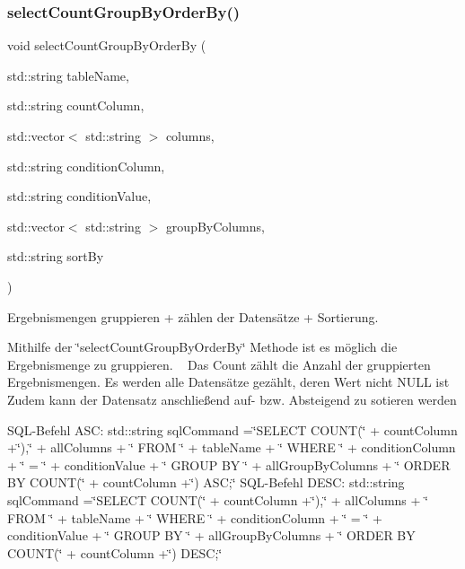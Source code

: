 \subsubsection{select\+Count\+Group\+By\+Order\+By()}
{\footnotesize\ttfamily void select\+Count\+Group\+By\+Order\+By (\begin{DoxyParamCaption}\item[{std\+::string}]{table\+Name,  }\item[{std\+::string}]{count\+Column,  }\item[{std\+::vector$<$ std\+::string $>$}]{columns,  }\item[{std\+::string}]{condition\+Column,  }\item[{std\+::string}]{condition\+Value,  }\item[{std\+::vector$<$ std\+::string $>$}]{group\+By\+Columns,  }\item[{std\+::string}]{sort\+By }\end{DoxyParamCaption})}



Ergebnismengen gruppieren + zählen der Datensätze + Sortierung. 

Mithilfe der \char`\"{}select\+Count\+Group\+By\+Order\+By\char`\"{} Methode ist es möglich die Ergebnismenge zu gruppieren. ~\newline
 Das Count zählt die Anzahl der gruppierten Ergebnismengen. Es werden alle Datensätze gezählt, deren Wert nicht N\+U\+LL ist Zudem kann der Datensatz anschließend auf-\/ bzw. Absteigend zu sotieren werden

S\+Q\+L-\/\+Befehl A\+SC\+: std\+::string sql\+Command =\char`\"{}\+S\+E\+L\+E\+C\+T C\+O\+U\+N\+T(\char`\"{} + count\+Column +\char`\"{}),\char`\"{} + all\+Columns + \char`\"{} F\+R\+O\+M \char`\"{} + table\+Name + \char`\"{} W\+H\+E\+R\+E \char`\"{} + condition\+Column + \char`\"{} = \textquotesingle{}\char`\"{} + condition\+Value + \char`\"{}\textquotesingle{} G\+R\+O\+U\+P B\+Y \char`\"{} + all\+Group\+By\+Columns + \char`\"{} O\+R\+D\+E\+R B\+Y C\+O\+U\+N\+T(\char`\"{} + count\+Column +\char`\"{}) A\+S\+C;\char`\"{} S\+Q\+L-\/\+Befehl D\+E\+SC\+: std\+::string sql\+Command =\char`\"{}\+S\+E\+L\+E\+C\+T C\+O\+U\+N\+T(\char`\"{} + count\+Column +\char`\"{}),\char`\"{} + all\+Columns + \char`\"{} F\+R\+O\+M \char`\"{} + table\+Name + \char`\"{} W\+H\+E\+R\+E \char`\"{} + condition\+Column + \char`\"{} = \textquotesingle{}\char`\"{} + condition\+Value + \char`\"{}\textquotesingle{} G\+R\+O\+U\+P B\+Y \char`\"{} + all\+Group\+By\+Columns + \char`\"{} O\+R\+D\+E\+R B\+Y C\+O\+U\+N\+T(\char`\"{} + count\+Column +\char`\"{}) D\+E\+S\+C;\char`\"{}


